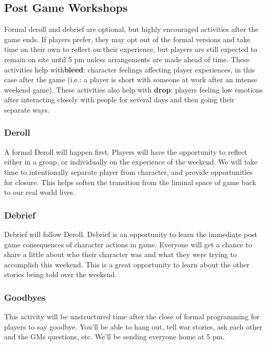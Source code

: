 \documentclass[sheet]{GL2020}
\begin{document}
\subsection{Post Game Workshops}
Formal deroll and debrief are optional, but highly encouraged activities after the game ends. If players prefer, they may opt out of the formal versions and take time on their own to reflect on their experience, but players are still expected to remain on site until 5 pm unless arrangements are made ahead of time. These activities help with\textbf{bleed}: character feelings affecting player experiences, in this case after the game (i.e.: a player is short with someone at work after an intense weekend game). These activities also help with \textbf{drop}: players feeling low emotions after interacting closely with people for several days and then going their separate ways.

\subsubsection{Deroll}
A formal Deroll will happen first. Players will have the opportunity to reflect either in a group, or individually on the experience of the weekend. We will take time to intentionally separate player from character, and provide opportunities for closure. This helps soften the transition from the liminal space of game back to our real world lives.

\subsubsection{Debrief} 
Debrief will follow Deroll. Debrief is an opportunity to learn the immediate post game consequences of character actions in game. Everyone will get a chance to share a little about who their character was and what they were trying to accomplish this weekend. This is a great opportunity to learn about the other stories being told over the weekend.



\subsubsection{Goodbyes}
This activity will be unstructured time after the close of formal programming for players to say goodbye. You’ll be able to hang out, tell war stories, ask each other and the GMs questions, etc. We’ll be sending everyone home at 5 pm.

\vfill
\end{document}
